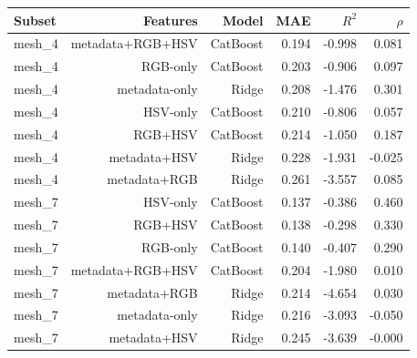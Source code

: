 \begin{tabular}{lrrrrr}
\toprule
Subset & Features & Model & MAE &  $R^2$ & $\rho$ \\
\midrule
mesh\_4 & metadata+RGB+HSV & CatBoost & 0.194 & -0.998 & 0.081 \\
mesh\_4 & RGB-only & CatBoost & 0.203 & -0.906 & 0.097 \\
mesh\_4 & metadata-only & Ridge & 0.208 & -1.476 & 0.301 \\
mesh\_4 & HSV-only & CatBoost & 0.210 & -0.806 & 0.057 \\
mesh\_4 & RGB+HSV & CatBoost & 0.214 & -1.050 & 0.187 \\
mesh\_4 & metadata+HSV & Ridge & 0.228 & -1.931 & -0.025 \\
mesh\_4 & metadata+RGB & Ridge & 0.261 & -3.557 & 0.085 \\
mesh\_7 & HSV-only & CatBoost & 0.137 & -0.386 & 0.460 \\
mesh\_7 & RGB+HSV & CatBoost & 0.138 & -0.298 & 0.330 \\
mesh\_7 & RGB-only & CatBoost & 0.140 & -0.407 & 0.290 \\
mesh\_7 & metadata+RGB+HSV & CatBoost & 0.204 & -1.980 & 0.010 \\
mesh\_7 & metadata+RGB & Ridge & 0.214 & -4.654 & 0.030 \\
mesh\_7 & metadata-only & Ridge & 0.216 & -3.093 & -0.050 \\
mesh\_7 & metadata+HSV & Ridge & 0.245 & -3.639 & -0.000 \\
\bottomrule
\end{tabular}
